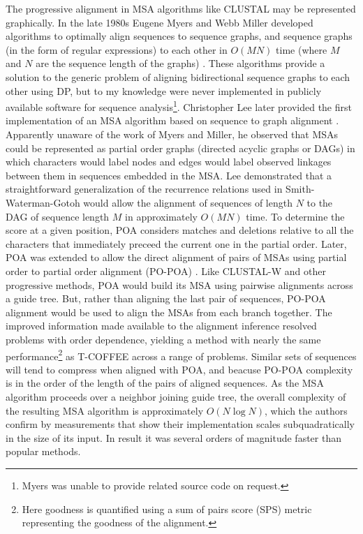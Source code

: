The progressive alignment in MSA algorithms like CLUSTAL may be represented graphically.
In the late 1980s Eugene Myers and Webb Miller developed algorithms to optimally align sequences to sequence graphs, and sequence graphs (in the form of regular expressions) to each other in $O(MN)$ time (where $M$ and $N$ are the sequence length of the graphs) \cite{myers1989approximate}.
These algorithms provide a solution to the generic problem of aligning bidirectional sequence graphs to each other using DP, but to my knowledge were never implemented in publicly available software for sequence analysis\footnote{Myers was unable to provide related source code on request.}.
Christopher Lee later provided the first implementation of an MSA algorithm based on sequence to graph alignment \cite{lee2002POA}.
Apparently unaware of the work of Myers and Miller, he observed that MSAs could be represented as partial order graphs (directed acyclic graphs or DAGs) in which characters would label nodes and edges would label observed linkages between them in sequences embedded in the MSA.
Lee demonstrated that a straightforward generalization of the recurrence relations used in Smith-Waterman-Gotoh would allow the alignment of sequences of length $N$ to the DAG of sequence length $M$ in approximately $O(MN)$ time.
To determine the score at a given position, POA considers matches and deletions relative to all the characters that immediately preceed the current one in the partial order.
Later, POA was extended to allow the direct alignment of pairs of MSAs using partial order to partial order alignment (PO-POA) \cite{grasso2004combining}.
Like CLUSTAL-W and other progressive methods, POA would build its MSA using pairwise alignments across a guide tree.
But, rather than aligning the last pair of sequences, PO-POA alignment would be used to align the MSAs from each branch together.
The improved information made available to the alignment inference resolved problems with order dependence, yielding a method with nearly the same performance\footnote{Here goodness is quantified using a sum of pairs score (SPS) metric representing the goodness of the alignment.} as T-COFFEE across a range of problems.
Similar sets of sequences will tend to compress when aligned with POA, and beacuse PO-POA complexity is in the order of the length of the pairs of aligned sequences.
As the MSA algorithm proceeds over a neighbor joining guide tree, the overall complexity of the resulting MSA algorithm is approximately $O(N\log{N})$, which the authors confirm by measurements that show their implementation scales subquadratically in the size of its input.
In result it was several orders of magnitude faster than popular methods.

